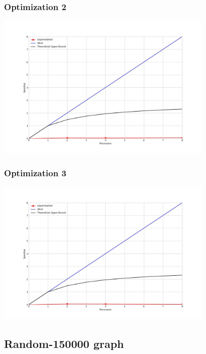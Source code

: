 \subsubsection{Optimization 2}
\begin{center}
    \resizebox{0.8\textwidth}{!}{}
    \includegraphics[width=0.78\textwidth]{../img/speedup-graph_type-fully-disconnected-1000000-O2}
\end{center}

\subsubsection{Optimization 3}
\begin{center}
    \resizebox{0.8\textwidth}{!}{}
    \includegraphics[width=0.78\textwidth]{../img/speedup-graph_type-fully-disconnected-1000000-O3}
\end{center}

\clearpage
\subsection{Random-150000 graph}
